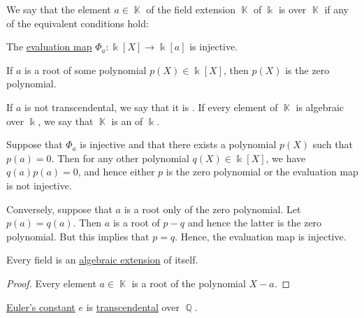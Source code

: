 \begin{definition}\label{def:transcendetal_element}
  We say that the element \( a \in \BbbK \) of the field extension \( \BbbK \) of \( \Bbbk \) is  over \( \BbbK \) if any of the equivalent conditions hold:
  \begin{thmenum}
     The \hyperref[thm:polynomial_ring_universal_property]{evaluation map} \( \Phi_a: \Bbbk[X] \to \Bbbk[a] \) is injective.

     If \( a \) is a root of some polynomial \( p(X) \in \Bbbk[X] \), then \( p(X) \) is the zero polynomial.
  \end{thmenum}

  If \( a \) is not transcendental, we say that it is . If every element of \( \BbbK \) is algebraic over \( \Bbbk \), we say that \( \BbbK \) is an  of \( \Bbbk \).
\end{definition}
\begin{defproof}
   Suppose that \( \Phi_a \) is injective and that there exists a polynomial \( p(X) \) such that \( p(a) = 0 \). Then for any other polynomial \( q(X) \in \Bbbk[X] \), we have \( q(a) p(a) = 0 \), and hence either \( p \) is the zero polynomial or the evaluation map is not injective.

   Conversely, suppose that \( a \) is a root only of the zero polynomial. Let \( p(a) = q(a) \). Then \( a \) is a root of \( p - q \) and hence the latter is the zero polynomial. But this implies that \( p = q \). Hence, the evaluation map is injective.
\end{defproof}

\begin{proposition}\label{thm:field_is_algebraic_over_itself}
  Every field is an \hyperref[def:transcendental_element]{algebraic extension} of itself.
\end{proposition}
\begin{proof}
  Every element \( a \in \BbbK \) is a root of the polynomial \( X - a \).
\end{proof}

\begin{theorem}\label{thm:eulers_constant_is_transcendental}
  \hyperref[def:exponential_function]{Euler's constant} \( e \) is \hyperref[def:transcendetal_element]{transcendental} over \( \BbbQ \).
\end{theorem}

